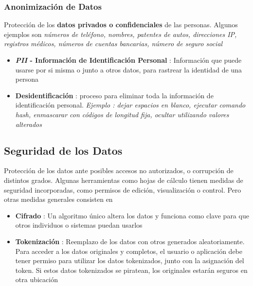 \subsubsection{Anonimización de Datos}
Protección de los \textbf{datos privados o confidenciales} de las personas. Algunos ejemplos son \textit{números de teléfono, nombres, patentes de autos, direcciones IP, registros médicos, números de cuentas bancarias, número de seguro social}
\begin{itemize}
    \item {\textbf{\textit{PII} - Información de Identificación Personal} : Información que puede usarse por si misma o junto a otros datos, para rastrear la identidad de una persona}
    \item {\textbf{Desidentificación} : proceso para eliminar toda la información de identificación personal. \textit{Ejemplo : dejar espacios en blanco, ejecutar comando hash, enmascarar con códigos de longitud fija, ocultar utilizando valores alterados}}
\end{itemize}

\subsection{Seguridad de los Datos}
Protección de los datos ante posibles accesos no autorizados, o corrupción de distintos grados. Algunas herramientas como hojas de cálculo tienen medidas de seguridad incorporadas, como permisos de edición, visualización o control. Pero otras medidas generales consisten en
\begin{itemize}
    \item {\textbf{Cifrado} : Un algoritmo único altera los datos y funciona como clave para que otros individuos o sistemas puedan usarlos}
    \item {\textbf{Tokenización} : Reemplazo de los datos con otros generados aleatoriamente. Para acceder a los datos originales y completos, el usuario o aplicación debe tener permiso para utilizar los datos tokenizados, junto con la asignación del token. Si estos datos tokenizados se piratean, los originales estarán seguros en otra ubicación}
\end{itemize}



\newpage